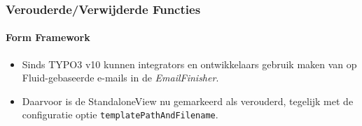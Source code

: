 %

\begin{frame}[fragile]
	\frametitle{Verouderde/Verwijderde Functies}
	\framesubtitle{Form Framework}

	\begin{itemize}
		\item Sinds TYPO3 v10 kunnen integrators en ontwikkelaars gebruik maken van
			op Fluid-gebaseerde e-mails in de \textit{EmailFinisher}.
		\item Daarvoor is de StandaloneView nu gemarkeerd als verouderd,
			tegelijk met de configuratie optie \texttt{templatePathAndFilename}.
	\end{itemize}

\end{frame}

